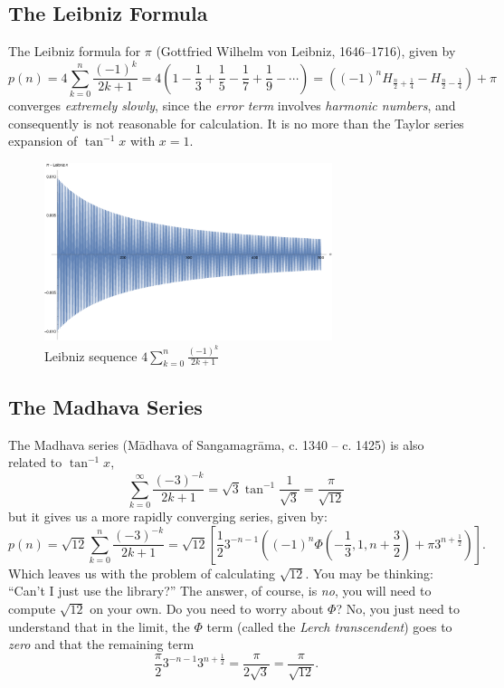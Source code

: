 \subsection{The Leibniz Formula}

The Leibniz formula for $\pi$ (Gottfried Wilhelm von Leibniz, 1646--1716), given by
$$
p(n)=4 \sum _{k=0}^n \frac{(-1)^k}{2 k+1} = 4 \left ( 1 - \frac{1}{3} +
\frac{1}{5} - \frac{1}{7} + \frac{1}{9} - \cdots\right ) =
\left((-1)^n
   H_{\frac{n}{2}+\frac{1}{4}}-H_{\frac{n}{2}-\frac{1}{4}}\right)+\pi
$$
converges \emph{extremely slowly}, since the \emph{error term} involves \emph{harmonic numbers}, and consequently is not reasonable
for calculation. It is no more than the Taylor series expansion of
$\tan^{-1} x$ with $x=1$.

\begin{figure}[p]
  \centerline{\includegraphics[width=0.75\textwidth]{figures/Leibniz.pdf}}
  \caption{Leibniz sequence $4 \sum _{k=0}^n \frac{(-1)^k}{2 k+1}$}
\end{figure}

\subsection{The Madhava Series}

The Madhava series (M\={a}dhava of Sangamagr\={a}ma, c.\xspace 1340 --
c.\xspace 1425) is also related to $\tan^{-1} x$,
$$
\sum_{k=0}^\infty \frac{(-3)^{-k}}{2 k+1} =\sqrt{3} \tan^{-1}
\frac{1}{\sqrt{3}} = \frac{\pi}{\sqrt{12}}
$$
but it gives us a more rapidly converging series, given by:
$$
p(n)=\sqrt{12} \sum _{k=0}^n \frac{(-3)^{-k}}{2 k+1} =
\sqrt{12} \left [ \frac{1}{2} 3^{-n-1} \left((-1)^n \Phi \left(-\frac{1}{3},1,n+\frac{3}{2}\right)+\pi
   3^{n+\frac{1}{2}}\right) \right ].
$$
Which leaves us with the problem of calculating $\sqrt{12}$. You may be
thinking: ``Can't I just use the library?'' The answer, of course, is
\emph{no}, you will need to compute $\sqrt{12}$ on your own.
Do you need to worry about $\Phi$? No, you just need to understand that in the limit,
the $\Phi$ term (called the \emph{Lerch transcendent})
 goes to \emph{zero} and that the remaining term
$$
\frac{\pi}{2} 3^{-n-1} 3^{n+\frac{1}{2}} = \frac{\pi}{2 \sqrt{3}} = \frac{\pi}{\sqrt{12}}.
$$


